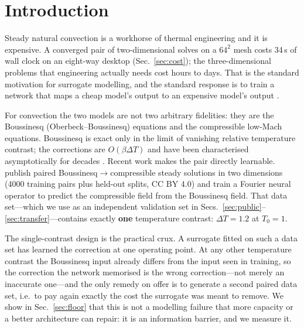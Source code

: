 \documentclass[11pt,a4paper]{article}
\begin{document}
\begin{abstract}
\noindent The practical statement is narrow and testable: the $\varepsilon$ dependence of the
Boussinesq--compressible pair is known in closed form, so it should be put outside the network
rather than discovered from data. The same output structure transfers unchanged from a U-Net to a
Fourier neural operator, and the measured speed-up is $5.4\times10^3$ per sample and
$6.9\times10^4$ in batches.

\vspace{4pt}
\noindent\textbf{Keywords:} natural convection; Boussinesq approximation; low-Mach compressible flow;
physics-informed surrogate; neural operator; break symmetry
\end{abstract}

\section{Introduction}
\label{sec:intro}

Steady natural convection is a workhorse of thermal engineering and it is expensive. A converged
pair of two-dimensional solves on a $64^2$ mesh costs 34\,s of wall clock on an eight-way desktop
(Sec.~\ref{sec:cost}); the three-dimensional problems that engineering actually needs cost hours to
days. That is the standard motivation for surrogate modelling, and the standard response is to
train a network that maps a cheap model's output to an expensive model's output
\citep{giacomini2026surrogates,meng2025physics}.

For convection the two models are not two arbitrary fidelities: they are the Boussinesq
(Oberbeck--Boussinesq) equations and the compressible low-Mach equations. Boussinesq is exact only
in the limit of vanishing relative temperature contrast; the corrections are $O(\beta\Delta T)$ and
have been characterised asymptotically for decades \citep{spiegel1960boussinesq,gray1976validity}.
Recent work makes the pair directly learnable. \citet{menglik2026neural} publish paired
Boussinesq$\to$compressible steady solutions in two dimensions (4000 training pairs plus held-out
splits, CC BY 4.0) and train a Fourier neural operator \citep{li2021fourier} to predict the
compressible field from the Boussinesq field. That data set---which we use as an independent
validation set in Secs.~\ref{sec:public}--\ref{sec:transfer}---contains exactly \textbf{one}
temperature contrast: $\Delta T=1.2$ at $T_0=1$.

The single-contrast design is the practical crux. A surrogate fitted on such a data set has learned
the correction at one operating point. At any other temperature contrast the Boussinesq input
already differs from the input seen in training, so the correction the network memorised is the
wrong correction---not merely an inaccurate one---and the only remedy on offer is to generate a
second paired data set, i.e.\ to pay again exactly the cost the surrogate was meant to remove. We
show in Sec.~\ref{sec:floor} that this is not a modelling failure that more capacity or a better
architecture can repair: it is an information barrier, and we measure it.
\end{document}
